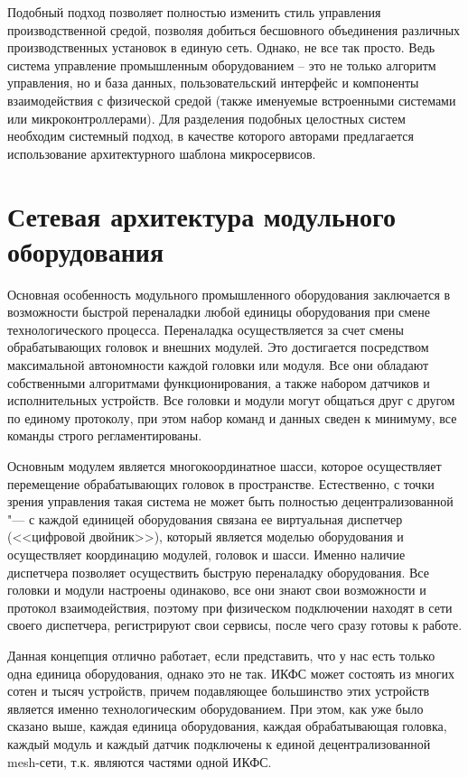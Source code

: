 Подобный подход позволяет полностью изменить стиль управления производственной средой, позволяя добиться бесшовного объединения различных производственных установок в единую сеть. Однако, не все так просто. Ведь система управление промышленным оборудованием – это не только алгоритм управления, но и база данных, пользовательский интерфейс и компоненты взаимодействия с физической средой (также именуемые встроенными системами или микроконтроллерами). Для разделения подобных целостных систем необходим системный подход, в качестве которого авторами предлагается использование архитектурного шаблона микросервисов.

\section{Сетевая архитектура модульного оборудования}\label{sec:ch3/sec2}

Основная особенность модульного промышленного оборудования заключается в возможности быстрой переналадки любой единицы оборудования при смене технологического процесса. Переналадка осуществляется за счет смены обрабатывающих головок и внешних модулей.  Это достигается посредством максимальной автономности каждой головки или модуля. Все они обладают собственными алгоритмами функционирования, а также набором датчиков и исполнительных устройств. Все головки и модули могут общаться друг с другом по единому протоколу, при этом набор команд и данных сведен к минимуму, все команды строго регламентированы.

Основным модулем является многокоординатное шасси, которое осуществляет перемещение обрабатывающих головок в пространстве. Естественно, с точки зрения управления такая система не может быть полностью децентрализованной "--- с каждой единицей оборудования связана ее виртуальная диспетчер (<<цифровой двойник>>), который является моделью оборудования и осуществляет координацию модулей, головок и шасси. Именно наличие диспетчера позволяет осуществить быструю переналадку оборудования. Все головки и модули настроены одинаково, все они знают свои возможности и протокол взаимодействия, поэтому при физическом подключении находят в сети своего диспетчера, регистрируют свои сервисы, после чего сразу готовы к работе.

Данная концепция отлично работает, если представить, что у нас есть только одна единица оборудования, однако это не так. ИКФС может состоять из многих сотен и тысяч устройств, причем подавляющее большинство этих устройств является именно технологическим оборудованием. При этом, как уже было сказано выше, каждая единица оборудования, каждая обрабатывающая головка, каждый модуль и каждый датчик подключены к единой децентрализованной mesh-сети, т.\:к. являются частями одной ИКФС.

